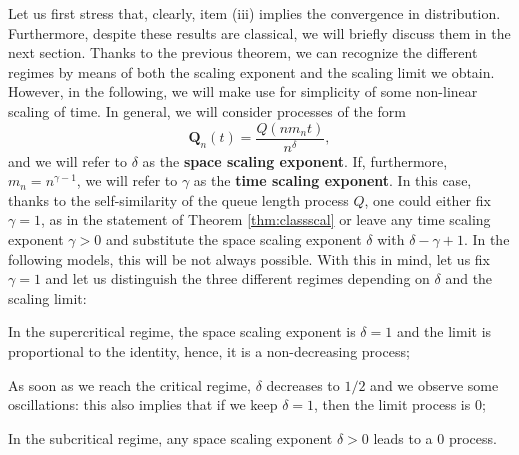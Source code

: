 \documentclass[]{amsart}
\numberwithin{equation}{section}
\theoremstyle{remark}
\theoremstyle{definition}
\begin{document}
{Let us first stress that, clearly, item (iii) implies the convergence in distribution. Furthermore, despite these results are classical, we will briefly discuss them in the next section. Thanks to the previous theorem, we can recognize the different regimes by means of both the scaling exponent and the scaling limit we obtain. However, in the following, we will make use for simplicity of some non-linear scaling of time. In general, we will consider processes of the form
\begin{equation*}
	\mathbf{Q}_n(t)=\frac{Q(nm_n t)}{n^\delta},
\end{equation*}
and we will refer to $\delta$ as the \textbf{space scaling exponent}. If, furthermore, $m_n=n^{\gamma-1}$, we will refer to $\gamma$ as the \textbf{time scaling exponent}. In this case, thanks to the self-similarity of the queue length process $Q$, one could either fix $\gamma=1$, as in the statement of Theorem \ref{thm:classscal} or leave any time scaling exponent $\gamma>0$ and substitute the space scaling exponent $\delta$ with $\delta-\gamma+1$. In the following models, this will be not always possible. With this in mind, let us fix $\gamma=1$ and let us distinguish the three different regimes depending on $\delta$ and the scaling limit:}
\begin{itemize}
	\item In the supercritical regime, the space scaling exponent is $\delta=1$ and the limit is proportional to the identity, hence, it is a non-decreasing process;
	\item As soon as we reach the critical regime, $\delta$ decreases to $1/2$ and we observe some oscillations: this also implies that if we keep $\delta=1$, then the limit process is $0$;
	{\item In the subcritical regime, any space scaling exponent $\delta>0$ leads to a $0$ process.}
\end{itemize}
\end{document}
